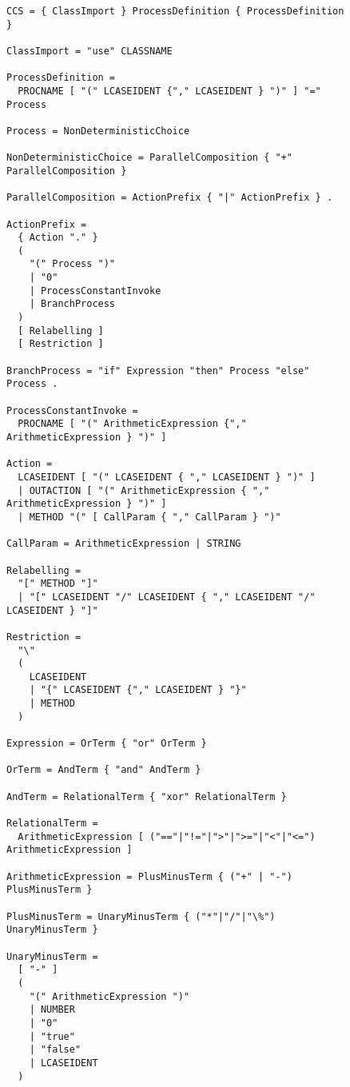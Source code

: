 	\begin{figure}
\lstset{showtabs=false,showspaces=false,showstringspaces=false}
\begin{lstlisting}[caption=EBNF Productions of CCS parser,frame=trbl,label=lst:ccs_ebnf,basicstyle=\scriptsize\ttfamily,showtabs=false,showspaces=false]
CCS = { ClassImport } ProcessDefinition { ProcessDefinition } 

ClassImport = "use" CLASSNAME 

ProcessDefinition = 
  PROCNAME [ "(" LCASEIDENT {"," LCASEIDENT } ")" ] "=" Process 

Process = NonDeterministicChoice

NonDeterministicChoice = ParallelComposition { "+" ParallelComposition }

ParallelComposition = ActionPrefix { "|" ActionPrefix } .

ActionPrefix =
  { Action "." }
  (
    "(" Process ")"
    | "0"
    | ProcessConstantInvoke
    | BranchProcess
  )
  [ Relabelling ]
  [ Restriction ]

BranchProcess = "if" Expression "then" Process "else" Process .

ProcessConstantInvoke = 
  PROCNAME [ "(" ArithmeticExpression {"," ArithmeticExpression } ")" ]

Action =
  LCASEIDENT [ "(" LCASEIDENT { "," LCASEIDENT } ")" ]
  | OUTACTION [ "(" ArithmeticExpression { "," ArithmeticExpression } ")" ]
  | METHOD "(" [ CallParam { "," CallParam } ")"

CallParam = ArithmeticExpression | STRING

Relabelling =
  "[" METHOD "]"
  | "[" LCASEIDENT "/" LCASEIDENT { "," LCASEIDENT "/" LCASEIDENT } "]"

Restriction = 
  "\" 
  (
    LCASEIDENT 
    | "{" LCASEIDENT {"," LCASEIDENT } "}"
    | METHOD
  )        

Expression = OrTerm { "or" OrTerm }

OrTerm = AndTerm { "and" AndTerm }

AndTerm = RelationalTerm { "xor" RelationalTerm }

RelationalTerm = 
  ArithmeticExpression [ ("=="|"!="|">"|">="|"<"|"<=") ArithmeticExpression ]
		
ArithmeticExpression = PlusMinusTerm { ("+" | "-") PlusMinusTerm }

PlusMinusTerm = UnaryMinusTerm { ("*"|"/"|"\%") UnaryMinusTerm }

UnaryMinusTerm =
  [ "-" ]                                   
  (
    "(" ArithmeticExpression ")"
    | NUMBER 
    | "0"
    | "true"
    | "false"
    | LCASEIDENT
  )
	\end{lstlisting}
	\end{figure}
	
